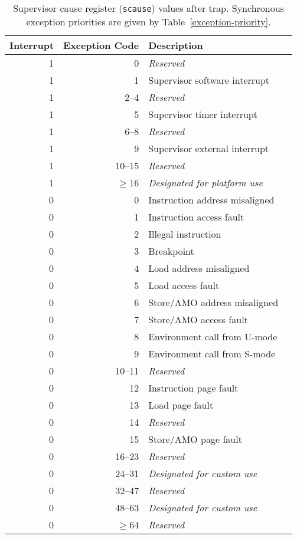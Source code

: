 \begin{table*}[h!]
\begin{center}
\begin{tabular}{|r|r|l|l|}
  \hline
  Interrupt & Exception Code  & Description \\
  \hline	 
  1         & 0               & {\em Reserved} \\
  1         & 1               & Supervisor software interrupt \\
  1         & 2--4            & {\em Reserved} \\
  1         & 5               & Supervisor timer interrupt \\
  1         & 6--8            & {\em Reserved} \\
  1         & 9               & Supervisor external interrupt \\
  1         & 10--15          & {\em Reserved} \\
  1         & $\ge$16         & {\em Designated for platform use} \\ \hline
  0         & 0               & Instruction address misaligned \\
  0         & 1               & Instruction access fault \\
  0         & 2               & Illegal instruction \\   
  0         & 3               & Breakpoint \\
  0         & 4               & Load address misaligned \\
  0         & 5               & Load access fault \\
  0         & 6               & Store/AMO address misaligned \\
  0         & 7               & Store/AMO access fault \\
  0         & 8               & Environment call from U-mode \\
  0         & 9               & Environment call from S-mode \\
  0         & 10--11          & {\em Reserved} \\
  0         & 12              & Instruction page fault \\
  0         & 13              & Load page fault \\
  0         & 14              & {\em Reserved} \\
  0         & 15              & Store/AMO page fault \\
  0         & 16--23          & {\em Reserved} \\
  0         & 24--31          & {\em Designated for custom use} \\
  0         & 32--47          & {\em Reserved} \\
  0         & 48--63          & {\em Designated for custom use} \\
  0         & $\ge$64         & {\em Reserved} \\
  \hline
\end{tabular}
\end{center}
\caption{Supervisor cause register ({\tt scause}) values after trap.
Synchronous exception priorities are given by Table~\ref{exception-priority}.}
\label{scauses}
\end{table*}

